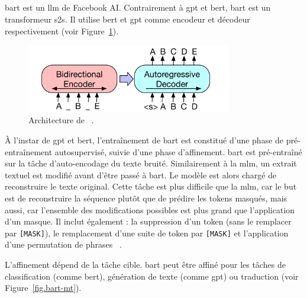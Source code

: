 \subsection{}

\Gls{bart} est un \gls{llm} de Facebook AI.
Contrairement à \gls{gpt} et \gls{bert}, \gls{bart} est un transformeur \gls{s2s}.
Il utilise \gls{bert} et \gls{gpt} comme encodeur et décodeur respectivement
(voir Figure~\ref{fig.bart}).

\begin{figure}[hbt]
    \centering
    \includegraphics[width=0.8\textwidth]{assets/images/bart.png}
    \caption[Architecture de ]
    {Architecture de %
    ~\cite{Lewis_Liu_Goyal_Ghazvininejad_Mohamed_Levy_Stoyanov_Zettlemoyer_2019}.}
    \label{fig.bart}
\end{figure}

À l'instar de \gls{gpt} et \gls{bert}, l'entraînement de \gls{bart} est constitué d'une phase de pré-entraînement
autosupervisé, suivie d'une phase d'affinement.
\gls{bart} est pré-entraîné sur la tâche d'auto-encodage du texte bruité.
Similairement à la \gls{mlm}, un extrait textuel est modifié avant d'être passé à \gls{bart}.
Le modèle est alors chargé de reconstruire le texte original.
Cette tâche est plus difficile que la \gls{mlm}, 
car le but est de reconstruire la séquence plutôt que de prédire les tokens masqués, 
mais aussi, car l'ensemble des modifications possibles est plus grand que l'application d'un masque.
Il inclut également : la suppression d'un token (sans le remplacer par \texttt{[MASK]}),
le remplacement d'une suite de token par \texttt{[MASK]} et l'application d'une permutation de phrases%
~\cite{Lewis_Liu_Goyal_Ghazvininejad_Mohamed_Levy_Stoyanov_Zettlemoyer_2019}.

L'affinement dépend de la tâche cible.
\gls{bart} peut être affiné pour les tâches de classification (comme \gls{bert}),
génération de texte (comme \gls{gpt})
ou traduction (voir Figure~\ref{fig.bart-mt}).

